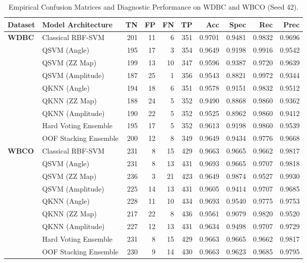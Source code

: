 \documentclass[11pt,a4paper]{article}
\begin{document}
\begin{table}[H]
\centering
\small
\caption{Empirical Confusion Matrices and Diagnostic Performance on WDBC and WBCO (Seed 42).}
\label{tab:cm_all}
\begin{tabularx}{\textwidth}{llrrrrrrrr}
\toprule
\textbf{Dataset} & \textbf{Model Architecture} & \textbf{TN} & \textbf{FP} & \textbf{FN} & \textbf{TP} & \textbf{Acc} & \textbf{Spec} & \textbf{Rec} & \textbf{Prec} \\
\midrule
\multirow{9}{*}{\textbf{WDBC}} 
& Classical RBF-SVM & 201 & 11 & 6 & 351 & 0.9701 & 0.9481 & 0.9832 & 0.9696 \\
& QSVM (Angle) & 195 & 17 & 3 & 354 & 0.9649 & 0.9198 & 0.9916 & 0.9542 \\
& QSVM (ZZ Map) & 199 & 13 & 10 & 347 & 0.9596 & 0.9387 & 0.9720 & 0.9639 \\
& QSVM (Amplitude) & 187 & 25 & 1 & 356 & 0.9543 & 0.8821 & 0.9972 & 0.9344 \\
& QKNN (Angle) & 194 & 18 & 6 & 351 & 0.9578 & 0.9151 & 0.9832 & 0.9512 \\
& QKNN (ZZ Map) & 188 & 24 & 5 & 352 & 0.9490 & 0.8868 & 0.9860 & 0.9362 \\
& QKNN (Amplitude) & 190 & 22 & 5 & 352 & 0.9525 & 0.8962 & 0.9860 & 0.9412 \\
& Hard Voting Ensemble & 195 & 17 & 5 & 352 & 0.9613 & 0.9198 & 0.9860 & 0.9539 \\
& OOF Stacking Ensemble & 200 & 12 & 8 & 349 & 0.9649 & 0.9434 & 0.9776 & 0.9668 \\
\midrule
\multirow{9}{*}{\textbf{WBCO}} 
& Classical RBF-SVM & 231 & 8 & 15 & 429 & 0.9663 & 0.9665 & 0.9662 & 0.9817 \\
& QSVM (Angle) & 231 & 8 & 13 & 431 & 0.9693 & 0.9665 & 0.9707 & 0.9818 \\
& QSVM (ZZ Map) & 236 & 3 & 21 & 423 & 0.9649 & 0.9874 & 0.9527 & 0.9930 \\
& QSVM (Amplitude) & 225 & 14 & 13 & 431 & 0.9605 & 0.9414 & 0.9707 & 0.9685 \\
& QKNN (Angle) & 228 & 11 & 10 & 434 & 0.9693 & 0.9540 & 0.9775 & 0.9753 \\
& QKNN (ZZ Map) & 217 & 22 & 8 & 436 & 0.9561 & 0.9079 & 0.9820 & 0.9520 \\
& QKNN (Amplitude) & 227 & 12 & 13 & 431 & 0.9634 & 0.9498 & 0.9707 & 0.9729 \\
& Hard Voting Ensemble & 231 & 8 & 15 & 429 & 0.9663 & 0.9665 & 0.9662 & 0.9817 \\
& OOF Stacking Ensemble & 230 & 9 & 14 & 430 & 0.9663 & 0.9623 & 0.9685 & 0.9795 \\
\bottomrule
\end{tabularx}
\end{table}
\end{document}
